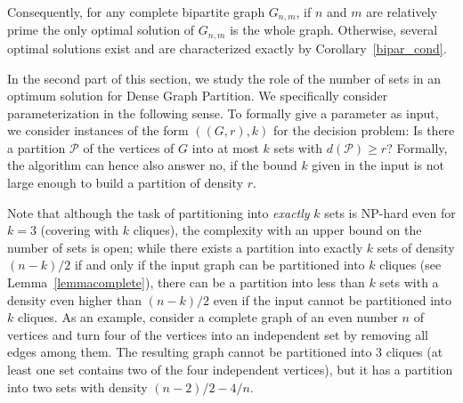 \documentclass[a4paper,USenglish,cleveref, autoref]{lipics-v2021}
\begin{document}
 Consequently, for  any complete bipartite graph $G_{n,m}$, if $n$ and $m$ are relatively prime  the only 
  optimal solution of $G_{n,m}$ is the whole graph. Otherwise, several optimal solutions exist and are characterized exactly by Corollary~\ref{bipar_cond}.
 
 
  
\medskip

In the second part of this section, we  study the role of the number of sets in an optimum solution for  {\sc Dense Graph Partition}. We specifically consider parameterization in the following sense. To formally give a parameter as input, we consider instances of the form $((G,r),k)$ for the decision problem: Is there a partition $\mathcal P$ of the vertices of $G$ into at most $k$ sets with $d(\mathcal P)\geq r$? Formally, the algorithm can hence also answer no, if the bound $k$ given in the input is not large enough to build a partition of density $r$.

Note that although the task of partitioning into \emph{exactly} $k$ sets is NP-hard even for $k=3$ (covering with $k$ cliques), the complexity with an upper bound on the number of sets is open; while there exists a partition into exactly $k$ sets of density $(n-k)/2$ if and only if the input graph can be partitioned into $k$ cliques (see Lemma~\ref{lemmacomplete}), there can be a partition into less than $k$ sets with a density even higher than $(n-k)/2$ even if the input cannot be partitioned into $k$ cliques. As an example, consider a complete graph of an even number $n$ of vertices and turn four of the vertices into an independent set by removing all edges among them. The resulting graph cannot be partitioned into 3 cliques (at least one set contains two of the four independent vertices), but it has a partition into two sets with density $(n-2)/2 -4/n$.

\end{document}
